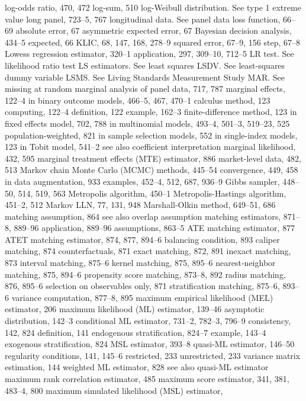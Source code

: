 log-odds ratio, 470, 472
log-sum, 510
log-Weibull distribution. See type 1 extreme value long panel, 723–5, 767
longitudinal data. See panel data
loss function, 66–69
absolute error, 67
asymmetric expected error, 67 Bayesian decision analysis, 434–5 expected, 66
KLIC, 68, 147, 168, 278–9 squared error, 67–9, 156
step, 67–8
Lowess regression estimator, 320–1 application, 297, 309–10, 712–5
LR test. See likelihood ratio test
LS estimators. See least squares
LSDV. See least-squares dummy variable
LSMS. See Living Standards Measurement Study
MAR. See missing at random
marginal analysis of panel data, 717, 787 marginal effects, 122–4
in binary outcome models, 466–5, 467, 470–1 calculus method, 123
computing, 122–4
definition, 122
example, 162–3
finite-difference method, 123
in fixed effects model, 702, 788
in multinomial models, 493–4, 501–3, 519–23, 525 population-weighted, 821
in sample selection models, 552
in single-index models, 123
in Tobit model, 541–2
see also coefficient interpretation
marginal likelihood, 432, 595
marginal treatment effects (MTE) estimator, 886 market-level data, 482, 513
Markov chain Monte Carlo (MCMC) methods,
445–54
convergence, 449, 458
in data augmentation, 933
examples, 452–4, 512, 687, 936–9
Gibbs sampler, 448–50, 514, 519, 563 Metropolis algorithm, 450–1 Metropolis-Hastings algorithm, 451–2, 512
Markov LLN, 77, 131, 948 Marshall-Olkin method, 649–51, 686 matching assumption, 864
see also overlap assumption matching estimators, 871–8, 889–96
application, 889–96
assumptions, 863–5
ATE matching estimator, 877
ATET matching estimator, 874, 877, 894–6 balancing condition, 893
caliper matching, 874
counterfactuals, 871
exact matching, 872, 891
inexact matching, 873
interval matching, 875–6
kernel matching, 875, 895–6 nearest-neighbor matching, 875, 894–6 propensity score matching, 873–8, 892 radius matching, 876, 895–6
selection on observables only, 871 stratification matching, 875–6, 893–6 variance computation, 877–8, 895
maximum empirical likelihood (MEL) estimator, 206 maximum likelihood (ML) estimator, 139–46
asymptotic distribution, 142–3
conditional ML estimator, 731–2, 782–3, 796–9 consistency, 142, 824
definition, 141
endogenous stratification, 824–7
example, 143–4
exogenous stratification, 824
MSL estimator, 393–8
quasi-ML estimator, 146–50
regularity conditions, 141, 145–6
restricted, 233
unrestricted, 233
variance matrix estimation, 144
weighted ML estimator, 828
see also quasi-ML estimator
maximum rank correlation estimator, 485 maximum score estimator, 341, 381, 483–4, 800 maximum simulated likelihood (MSL) estimator,
